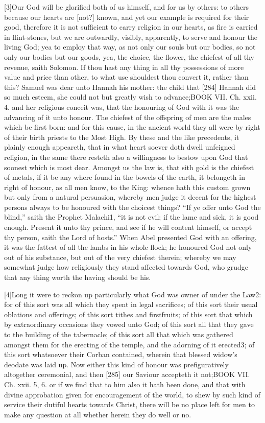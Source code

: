 [3]Our God will be glorified both of us himself, and for us by others: to others because our hearts are [not?] known, and yet our example is required for their good, therefore it is not sufficient to carry religion in our hearts, as fire is carried in flint-stones, but we are outwardly, visibly, apparently, to serve and honour the living God; yea to employ that way, as not only our souls but our bodies, so not only our bodies but our goods, yea, the choice, the flower, the chiefest of all thy revenue, saith Solomon. If thou hast any thing in all thy possessions of more value and price than other, to what use shouldest thou convert it, rather than this? Samuel was dear unto Hannah his mother: the child that [284] Hannah did so much esteem, she could not but greatly wish to advance;BOOK VII. Ch. xxii. 4. and her religious conceit was, that the honouring of God with it was the advancing of it unto honour. The chiefest of the offspring of men are the males which be first born: and for this cause, in the ancient world they all were by right of their birth priests to the Most High. By these and the like precedents, it plainly enough appeareth, that in what heart soever doth dwell unfeigned religion, in the same there resteth also a willingness to bestow upon God that soonest which is most dear. Amongst us the law is, that sith gold is the chiefest of metals, if it be any where found in the bowels of the earth, it belongeth in right of honour, as all men know, to the King: whence hath this custom grown but only from a natural persuasion, whereby men judge it decent for the highest persons always to be honoured with the choicest things? “If ye offer unto God the blind,” saith the Prophet Malachi1, “it is not evil; if the lame and sick, it is good enough. Present it unto thy prince, and see if he will content himself, or accept thy person, saith the Lord of hosts.” When Abel presented God with an offering, it was the fattest of all the lambs in his whole flock; he honoured God not only out of his substance, but out of the very chiefest therein; whereby we may somewhat judge how religiously they stand affected towards God, who grudge that any thing worth the having should be his.

[4]Long it were to reckon up particularly what God was owner of under the Law2: for of this sort was all which they spent in legal sacrifices; of this sort their usual oblations and offerings; of this sort tithes and firstfruits; of this sort that which by extraordinary occasions they vowed unto God; of this sort all that they gave to the building of the tabernacle; of this sort all that which was gathered amongst them for the erecting of the temple, and the adorning of it erected3; of this sort whatsoever their Corban contained, wherein that blessed widow’s deodate was laid up. Now either this kind of honour was prefiguratively altogether ceremonial, and then [285] our Saviour accepteth it not;BOOK VII. Ch. xxii. 5, 6. or if we find that to him also it hath been done, and that with divine approbation given for encouragement of the world, to shew by such kind of service their dutiful hearts towards Christ, there will be no place left for men to make any question at all whether herein they do well or no.

